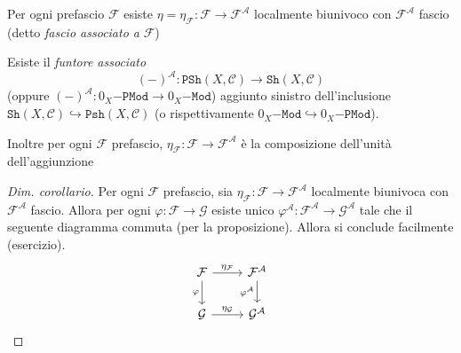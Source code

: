 \begin{proposition}{}
    Per ogni prefascio \(\mathcal{F}\) esiste \(\eta = \eta_\mathcal{F} :
    \mathcal{F} \to \mathcal{F}^{\mathcal{A}}\) localmente biunivoco con
    \(\mathcal{F}^{\mathcal{A}}\) fascio (detto \emph{fascio associato a}
    \(\mathcal{F}\))
\end{proposition}

\begin{corollary}{}
    Esiste il \emph{funtore associato}
    \[
      {(-)}^{\mathcal{A}} : \mathtt{PSh}{(X, \mathcal{C})} \to \mathtt{Sh}{(X,
      \mathcal{C})}
    \]
    (oppure \({(-)}^{\mathcal{A}} : 0_X\mathtt{-PMod} \to 0_X\mathtt{-Mod}\))
    aggiunto sinistro dell'inclusione \(\mathtt{Sh}{(X, \mathcal{C})}
    \hookrightarrow \mathtt{Psh}{(X, \mathcal{C})}\) (o rispettivamente
    \(0_X\mathtt{-Mod} \hookrightarrow 0_X\mathtt{-PMod}\)).

    Inoltre per ogni \(\mathcal{F}\) prefascio, \(\eta_\mathcal{F} : \mathcal{F}
    \to \mathcal{F}^{\mathcal{A}}\) è la composizione dell'unità
    dell'aggiunzione
\end{corollary}

\begin{proof}[Dim. corollario]
    Per ogni \(\mathcal{F}\) prefascio, sia \(\eta_\mathcal{F} : \mathcal{F} \to
    \mathcal{F}^{\mathcal{A}}\) localmente biunivoca con
    \(\mathcal{F}^{\mathcal{A}}\) fascio. Allora per ogni \(\varphi  :
    \mathcal{F} \to \mathcal{G}\) esiste unico \(\varphi ^{\mathcal{A}} :
    \mathcal{F} ^{\mathcal{A}} \to \mathcal{G}^{\mathcal{A}}\) tale che il
    seguente diagramma commuta (per la proposizione). Allora si conclude
    facilmente (esercizio).
\[\begin{tikzcd}
	{\mathcal{F}} & {\mathcal{F}^\mathcal{A}} \\
	{\mathcal{G}} & {\mathcal{G}^\mathcal{A}}
	\arrow["{\eta_\mathcal{F}}", from=1-1, to=1-2]
	\arrow["\varphi"', from=1-1, to=2-1]
	\arrow["{\varphi^\mathcal{A}}"', from=1-2, to=2-2]
	\arrow["{\eta_\mathcal{G}}", from=2-1, to=2-2]
\end{tikzcd}\]
\end{proof}

